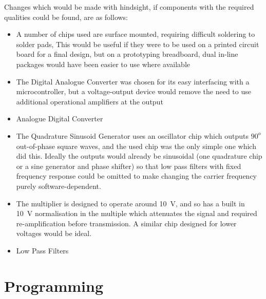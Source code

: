 \documentclass[../main.tex]{subfiles}
\begin{document}
Changes which would be made with hindsight, if components with the required qualities could be found, are as follows:

\begin{itemize}
	\item A number of chips used are surface mounted, requiring difficult soldering to solder pads, This would be useful if they were to be used on a printed circuit board for a final design, but on a prototyping breadboard, dual in-line packages would have been easier to use where available
	\item The Digital Analogue Converter was chosen for its easy interfacing with a microcontroller, but a voltage-output device would remove the need to use additional operational amplifiers at the output
	\item Analogue Digital Converter
	\item The Quadrature Sinusoid Generator uses an oscillator chip which outputs $90^o$ out-of-phase square waves, and the used chip was the only simple one which did this. Ideally the outputs would already be sinusoidal (one quadrature chip or a sine generator and phase shifter) so that low pass filters with fixed frequency response could be omitted to make changing the carrier frequency purely software-dependent.
	\item The multiplier is designed to operate around \SI{10}{\volt}, and so has a built in \SI{10}{\volt} normalisation in the multiple which attenuates the signal and required re-amplification before transmission. A similar chip designed for lower voltages would be ideal.
	\item Low Pass Filters
\end{itemize}


\section{Programming}
\end{document}

